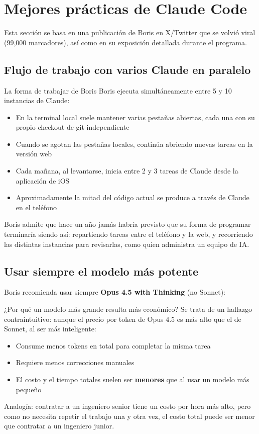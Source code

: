 \section{Mejores prácticas de Claude Code}

Esta sección se basa en una publicación de Boris en X/Twitter que se volvió viral (99,000 marcadores), así como en su exposición detallada durante el programa.

\subsection{Flujo de trabajo con varios Claude en paralelo}

\begin{importantbox}{La forma de trabajar de Boris}
Boris ejecuta simultáneamente entre 5 y 10 instancias de Claude:
\begin{itemize}
    \item En la terminal local suele mantener varias pestañas abiertas, cada una con su propio checkout de git independiente
    \item Cuando se agotan las pestañas locales, continúa abriendo nuevas tareas en la versión web
    \item Cada mañana, al levantarse, inicia entre 2 y 3 tareas de Claude desde la aplicación de iOS
    \item Aproximadamente la mitad del código actual se produce a través de Claude en el teléfono
\end{itemize}
\end{importantbox}

Boris admite que hace un año jamás habría previsto que su forma de programar terminaría siendo así: repartiendo tareas entre el teléfono y la web, y recorriendo las distintas instancias para revisarlas, como quien administra un equipo de IA.

\subsection{Usar siempre el modelo más potente}

Boris recomienda usar siempre \textbf{Opus 4.5 with Thinking} (no Sonnet):

\begin{knowledgebox}{¿Por qué un modelo más grande resulta más económico?}
Se trata de un hallazgo contraintuitivo: aunque el precio por token de Opus 4.5 es más alto que el de Sonnet, al ser más inteligente:
\begin{itemize}
    \item Consume menos tokens en total para completar la misma tarea
    \item Requiere menos correcciones manuales
    \item El costo y el tiempo totales suelen ser \textbf{menores} que al usar un modelo más pequeño
\end{itemize}
Analogía: contratar a un ingeniero senior tiene un costo por hora más alto, pero como no necesita repetir el trabajo una y otra vez, el costo total puede ser menor que contratar a un ingeniero junior.
\end{knowledgebox}

